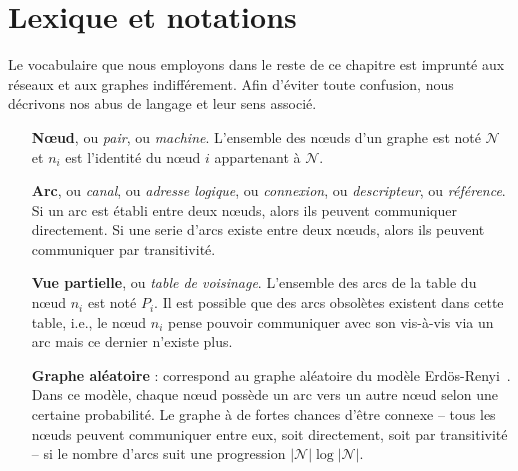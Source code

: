 
\section{Lexique et notations}
\label{net:sec:lexique}

Le vocabulaire que nous employons dans le reste de ce chapitre est imprunté aux
réseaux et aux graphes indifférement. Afin d'éviter toute confusion, nous
décrivons nos abus de langage et leur sens associé.

\begin{itemize}
\item [\textbf{Nœud},] ou \emph{pair}, ou \emph{machine}. L'ensemble des nœuds
  d'un graphe est noté $\mathcal{N}$ et $n_i$ est l'identité du nœud $i$
  appartenant à $\mathcal{N}$.
\item [\textbf{Arc},] ou \emph{canal}, ou \emph{adresse logique}, ou
  \emph{connexion}, ou \emph{descripteur}, ou \emph{référence}. Si un arc est
  établi entre deux nœuds, alors ils peuvent communiquer directement. Si une
  serie d'arcs existe entre deux nœuds, alors ils peuvent communiquer par
  transitivité.
\item [\textbf{Vue partielle},] ou \emph{table de voisinage}. L'ensemble des
  arcs de la table du nœud $n_i$ est noté $P_i$. Il est possible que des arcs
  obsolètes existent dans cette table, i.e., le nœud $n_i$ pense pouvoir
  communiquer avec son vis-à-vis via un arc mais ce dernier n'existe plus.
\item [\textbf{Graphe aléatoire} :] correspond au graphe aléatoire du modèle
  Erdös-Renyi~\cite{erdos1959random}. Dans ce modèle, chaque nœud possède un
  arc vers un autre nœud selon une certaine probabilité. Le graphe à de fortes
  chances d'être connexe -- tous les nœuds peuvent communiquer entre eux, soit
  directement, soit par transitivité -- si le nombre d'arcs suit une progression
  $|\mathcal{N}|\log |\mathcal{N}|$.
\end{itemize}

